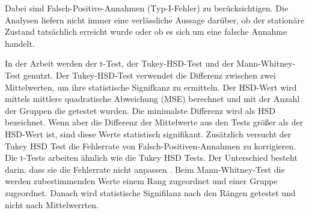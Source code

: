 \documentclass{article}
\begin{document}
Dabei sind Falsch-Positive-Annahmen (Typ-I-Fehler) zu berücksichtigen. Die Analysen liefern nicht immer eine verlässliche Aussage darüber, ob der stationäre Zustand tatsächlich erreicht wurde oder ob es sich um eine falsche Annahme handelt.

In der Arbeit werden der t-Test, der Tukey-HSD-Test und der Mann-Whitney-Test genutzt.
Der Tukey-HSD-Test verwendet die Differenz zwischen zwei Mittelwerten, um ihre statistische Signifkanz zu ermitteln.
Der HSD-Wert wird mittels mittlere quadratische Abweichung (MSE) berechnet und mit der Anzahl der Gruppen die getestet wurden.
Die minimalste Differenz wird als HSD bezeichnet. Wenn aber die Differenz der Mittelwerte aus den Tests größer als der HSD-Wert ist, sind diese Werte statistisch signifikant. Zusätzlich versucht der Tukey HSD Test die Fehlerrate von Falsch-Positiven-Annahmen zu korrigieren. 
Die t-Tests arbeiten ähnlich wie die Tukey HSD Tests. Der Unterschied besteht darin, dass sie die Fehlerrate nicht anpassen \cite{schmidtPaul} \cite{tukeyhsdwiki}. 
Beim Mann-Whitney-Test die werden zubestimmenden Werte einem Rang zugeordnet und einer Gruppe zugeordnet. Danach wird statistische Signifilanz nach den Rängen getestet und nicht nach Mittelwerrten.  
\end{document}
